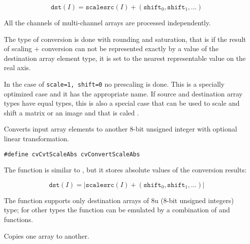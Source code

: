 \[
\texttt{dst}(I) = \texttt{scale} \texttt{src}(I) + (\texttt{shift}_0,\texttt{shift}_1,...)
\]

All the channels of multi-channel arrays are processed independently.

The type of conversion is done with rounding and saturation, that is if the
result of scaling + conversion can not be represented exactly by a value
of the destination array element type, it is set to the nearest representable
value on the real axis.

In the case of \texttt{scale=1, shift=0} no prescaling is done. This is a specially
optimized case and it has the appropriate  name. If
source and destination array types have equal types, this is also a
special case that can be used to scale and shift a matrix or an image
and that is caled .


Converts input array elements to another 8-bit unsigned integer with optional linear transformation.


\begin{lstlisting}
#define cvCvtScaleAbs cvConvertScaleAbs
\end{lstlisting}

\begin{description}
\end{description}


The function is similar to , but it stores absolute values of the conversion results:

\[
\texttt{dst}(I) = |\texttt{scale} \texttt{src}(I) + (\texttt{shift}_0,\texttt{shift}_1,...)|
\]

The function supports only destination arrays of 8u (8-bit unsigned integers) type; for other types the function can be emulated by a combination of  and  functions.

Copies one array to another.


\begin{description}
\end{description}


